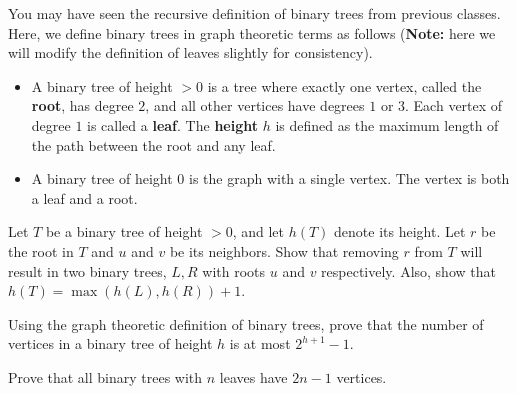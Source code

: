 \documentclass[11pt]{article}
\begin{document}

You may have seen the recursive definition of binary trees from previous classes. Here, we define binary trees in graph theoretic terms as follows (\textbf{Note:} here we will modify the definition of leaves slightly for consistency). 
\begin{itemize}
	\item A binary tree of height $> 0$ is a tree where exactly one vertex, called the \textbf{root}, has degree $2$, and all other vertices have degrees $1$ or $3$. Each vertex of degree $1$ is called a \textbf{leaf}. The \textbf{height} $h$ is defined as the maximum length of the path between the root and any leaf.
	\item A binary tree of height $0$ is the graph with a single vertex. The vertex is both a leaf and a root.
\end{itemize}
\begin{Parts}
	\Part Let $T$ be a binary tree of height $> 0$, and let $h(T)$ denote its height. Let $r$ be the root in $T$ and $u$ and $v$ be its neighbors. Show that removing $r$ from $T$ will result in two binary trees, $L,R$ with roots $u$ and $v$ respectively. Also, show that $h(T) = \max(h(L),h(R)) + 1$.
		
	\Part Using the graph theoretic definition of binary trees, prove that the number of vertices in a binary tree of height $h$ is at most $2^{h+1}-1$.
	
	\Part Prove that all binary trees with $n$ leaves have $2n-1$ vertices.
\end{Parts}
\end{document}

